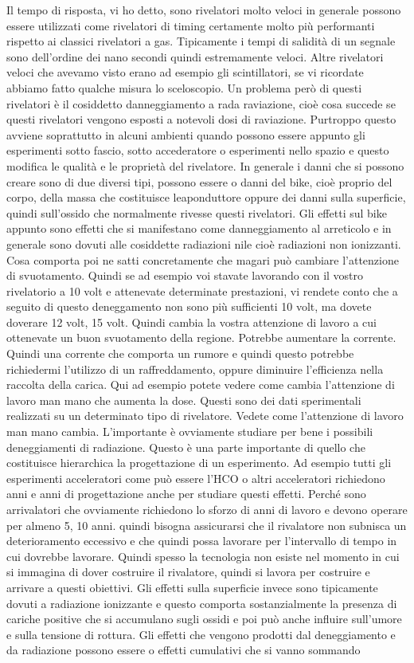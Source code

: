 {Il tempo di risposta, vi ho detto, sono rivelatori molto veloci in generale possono essere utilizzati come rivelatori di timing certamente molto più performanti rispetto ai classici rivelatori a gas. Tipicamente i tempi di salidità di un segnale sono dell'ordine dei nano secondi quindi estremamente veloci. Altre rivelatori veloci che avevamo visto erano ad esempio gli scintillatori, se vi ricordate abbiamo fatto qualche misura lo sceloscopio. Un problema però di questi rivelatori è il cosiddetto danneggiamento a rada raviazione, cioè cosa succede se questi rivelatori vengono esposti a notevoli dosi di raviazione. Purtroppo questo avviene soprattutto in alcuni ambienti quando possono essere appunto gli esperimenti sotto fascio, sotto accederatore o esperimenti nello spazio e questo modifica le qualità e le proprietà del rivelatore. In generale i danni che si possono creare sono di due diversi tipi, possono essere o danni del bike, cioè proprio del corpo, della massa che costituisce leaponduttore oppure dei danni sulla superficie, quindi sull'ossido che normalmente rivesse questi rivelatori. Gli effetti sul bike appunto sono effetti che si manifestano come danneggiamento al arreticolo e in generale sono dovuti alle cosiddette radiazioni nile cioè radiazioni non ionizzanti. Cosa comporta poi ne satti concretamente che magari può cambiare l'attenzione di svuotamento. Quindi se ad esempio voi stavate lavorando con il vostro rivelatorio a 10 volt e attenevate determinate prestazioni, vi rendete conto che a seguito di questo deneggamento non sono più sufficienti 10 volt, ma dovete doverare 12 volt, 15 volt. Quindi cambia la vostra attenzione di lavoro a cui ottenevate un buon svuotamento della regione. Potrebbe aumentare la corrente. Quindi una corrente che comporta un rumore e quindi questo potrebbe richiedermi l'utilizzo di un raffreddamento, oppure diminuire l'efficienza nella raccolta della carica. Qui ad esempio potete vedere come cambia l'attenzione di lavoro man mano che aumenta la dose. Questi sono dei dati sperimentali realizzati su un determinato tipo di rivelatore. Vedete come l'attenzione di lavoro man mano cambia. L'importante è ovviamente studiare per bene i possibili deneggiamenti di radiazione. Questo è una parte importante di quello che costituisce hierarchica la progettazione di un esperimento. Ad esempio tutti gli esperimenti acceleratori come può essere l'HCO o altri acceleratori richiedono anni e anni di progettazione anche per studiare questi effetti. Perché sono arrivalatori che ovviamente richiedono lo sforzo di anni di lavoro e devono operare per almeno 5, 10 anni. quindi bisogna assicurarsi che il rivalatore non subnisca un deterioramento eccessivo e che quindi possa lavorare per l'intervallo di tempo in cui dovrebbe lavorare. Quindi spesso la tecnologia non esiste nel momento in cui si immagina di dover costruire il rivalatore, quindi si lavora per costruire e arrivare a questi obiettivi. Gli effetti sulla superficie invece sono tipicamente dovuti a radiazione ionizzante e questo comporta sostanzialmente la presenza di cariche positive che si accumulano sugli ossidi e poi può anche influire sull'umore e sulla tensione di rottura. Gli effetti che vengono prodotti dal deneggiamento e da radiazione possono essere o effetti cumulativi che si vanno sommando }
